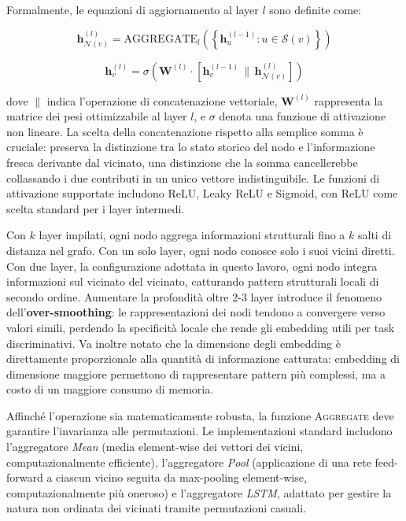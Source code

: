 Formalmente, le equazioni di aggiornamento al layer $l$ sono definite come:

\begin{equation} \mathbf{h}_{\mathcal{N}(v)}^{(l)} = \text{AGGREGATE}_l\left( \left\{\mathbf{h}_u^{(l-1)} : u \in \mathcal{S}(v)\right\}\right) \end{equation}

\begin{equation} \mathbf{h}_v^{(l)} = \sigma\left(\mathbf{W}^{(l)} \cdot \left[\mathbf{h}_v^{(l-1)} \,\|\, \mathbf{h}_{\mathcal{N}(v)}^{(l)}\right] \right) \end{equation}

dove $\|$ indica l'operazione di concatenazione vettoriale, $\mathbf{W}^{(l)}$ rappresenta la matrice dei pesi ottimizzabile al layer $l$, e $\sigma$ denota una funzione di attivazione non lineare. La scelta della concatenazione rispetto alla semplice somma è cruciale: preserva la distinzione tra lo stato storico del nodo e l'informazione fresca derivante dal vicinato, una distinzione che la somma cancellerebbe collassando i due contributi in un unico vettore indistinguibile. Le funzioni di attivazione supportate includono ReLU, Leaky ReLU e Sigmoid, con ReLU come scelta standard per i layer intermedi.

Con $k$ layer impilati, ogni nodo aggrega informazioni strutturali fino a $k$ salti di distanza nel grafo. Con un solo layer, ogni nodo conosce solo i suoi vicini diretti. Con due layer,  la configurazione adottata in questo lavoro,  ogni nodo integra informazioni sul vicinato del vicinato, catturando pattern strutturali locali di secondo ordine. Aumentare la profondità oltre 2-3 layer introduce il fenomeno dell'\textbf{over-smoothing}: le rappresentazioni dei nodi tendono a convergere verso valori simili, perdendo la specificità locale che rende gli embedding utili per task discriminativi. Va inoltre notato che la dimensione degli embedding è direttamente proporzionale alla quantità di informazione catturata: embedding di dimensione maggiore permettono di rappresentare pattern più complessi, ma a costo di un maggiore consumo di memoria.

Affinché l'operazione sia matematicamente robusta, la funzione \textsc{Aggregate} deve garantire l'invarianza alle permutazioni. Le implementazioni standard includono l'aggregatore \textit{Mean} (media element-wise dei vettori dei vicini, computazionalmente efficiente), l'aggregatore \textit{Pool} (applicazione di una rete feed-forward a ciascun vicino seguita da max-pooling element-wise, computazionalmente più oneroso) e l'aggregatore \textit{LSTM}, adattato per gestire la natura non ordinata dei vicinati tramite permutazioni casuali.


